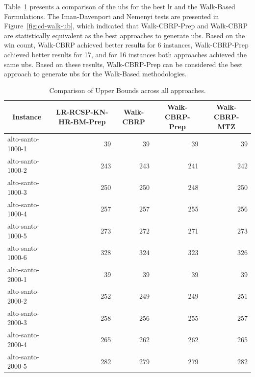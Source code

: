 Table~\ref{tab:results-all-upper-bounds} presents a comparison of the \gls{ub}s for the best \gls{lr} and the Walk-Based Formulations. The Iman-Davenport and Nemenyi tests are presented in Figure~\ref{fig:cd-walk-ub}, which indicated that Walk-CBRP-Prep and Walk-CBRP are statistically equivalent as the best approaches to generate \gls{ub}s.
Based on the win count, Walk-CBRP achieved better results for 6 instances, Walk-CBRP-Prep achieved better results for 17, and for 16 instances both approaches achieved the same \gls{ub}s. Based on these results, Walk-CBRP-Prep can be considered the best approach to generate \gls{ub}s for the Walk-Based methodologies.

\begin{table}[ht!]
	\centering
	\caption{Comparison of Upper Bounds across all approaches.}
	\label{tab:results-all-upper-bounds}
	{\tiny%
		\begin{tabular}{lrrrr}
			\toprule
			\multicolumn{1}{c}{\textbf{Instance}}              &
			\multicolumn{1}{c}{\textbf{LR-RCSP-KN-HR-BM-Prep}} &
			\multicolumn{1}{c}{\textbf{Walk-CBRP}}             &
			\multicolumn{1}{c}{\textbf{Walk-CBRP-Prep}}        &
			\multicolumn{1}{c}{\textbf{Walk-CBRP-MTZ}}                                 \\
			\midrule
			alto-santo-1000-1                                  & 39  & 39  & 39  & 39  \\
			alto-santo-1000-2                                  & 243 & 243 & 241 & 242 \\
			alto-santo-1000-3                                  & 250 & 250 & 248 & 250 \\
			alto-santo-1000-4                                  & 257 & 257 & 255 & 256 \\
			alto-santo-1000-5                                  & 273 & 272 & 271 & 273 \\
			alto-santo-1000-6                                  & 328 & 324 & 323 & 326 \\
			alto-santo-2000-1                                  & 39  & 39  & 39  & 39  \\
			alto-santo-2000-2                                  & 252 & 249 & 249 & 251 \\
			alto-santo-2000-3                                  & 258 & 256 & 255 & 257 \\
			alto-santo-2000-4                                  & 265 & 262 & 262 & 265 \\
			alto-santo-2000-5                                  & 282 & 279 & 279 & 282 \\

\end{tabular}}
\end{table}

